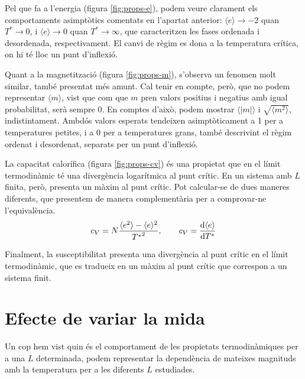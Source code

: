 \documentclass[a4paper]{article}
\begin{document}
Pel que fa a l'energia (figura \ref{fig:props-e}), podem veure clarament els comportaments asimptòtics comentats en l'apartat anterior: $\langle e \rangle \to -2$ quan $T^* \to 0$, i $\langle e \rangle \to 0$ quan $T^* \to \infty$, que caracteritzen les fases ordenada i desordenada, respectivament. El canvi de règim es dona a la temperatura crítica, on hi té lloc un punt d'inflexió.

Quant a la magnetització (figura \ref{fig:props-m}), s'observa un fenomen molt similar, també presentat més amunt. Cal tenir en compte, però, que no podem representar $\langle m \rangle$, vist que com que $m$ pren valors positius i negatius amb igual probabilitat, serà sempre 0. En comptes d'això, podem mostrar $\langle |m| \rangle$ i $\sqrt{\langle m^2 \rangle}$, indistintament. Ambdós valors esperats tendeixen asimptòticament a 1 per a temperatures petites, i a 0 per a temperatures grans, també descrivint el règim ordenat i desordenat, separats per un punt d'inflexió.

La capacitat calorífica (figura \ref{fig:props-cv}) és una propietat que en el límit termodinàmic té una divergència logarítmica al punt crític. En un sistema amb $L$ finita, però, presenta un màxim al punt crític. Pot calcular-se de dues maneres diferents, que presentem de manera complementària per a comprovar-ne l'equivalència.
\begin{equation*}
    c_V = N \frac{\langle e^2 \rangle - \langle e \rangle^2}{{T^*}^2}, \qquad c_V = \dv{\langle e \rangle}{T^*}
\end{equation*}

Finalment, la susceptibilitat presenta una divergència al punt crític en el límit termodinàmic, que es tradueix en un màxim al punt crític que correspon a un sistema finit.

\section{Efecte de variar la mida}

Un cop hem vist quin és el comportament de les propietats termodinàmiques per a una $L$ determinada, podem representar la dependència de mateixes magnituds amb la temperatura per a les diferents $L$ estudiades.
\end{document}
